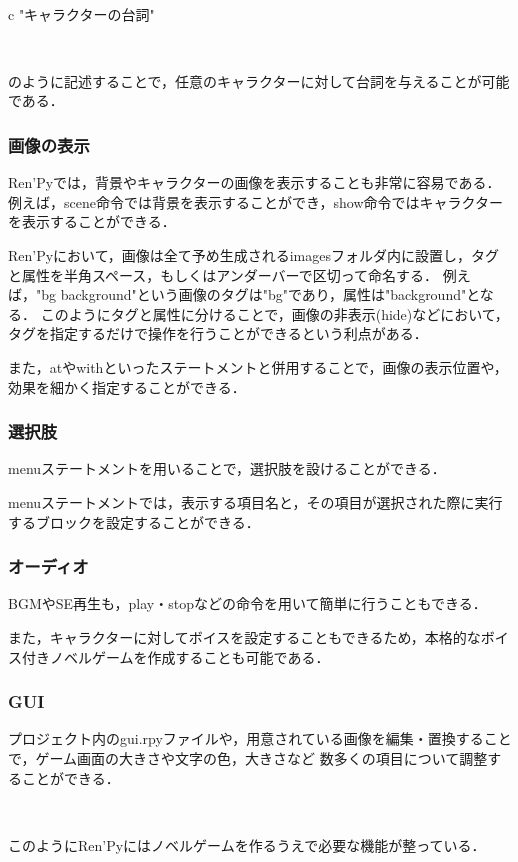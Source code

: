     ~

    c "キャラクターの台詞"

    ~

    のように記述することで，任意のキャラクターに対して台詞を与えることが可能である．

  \subsubsection{画像の表示}

    Ren'Pyでは，背景やキャラクターの画像を表示することも非常に容易である．
    例えば，scene命令では背景を表示することができ，show命令ではキャラクターを表示することができる．

    Ren'Pyにおいて，画像は全て予め生成されるimagesフォルダ内に設置し，タグと属性を半角スペース，もしくはアンダーバーで区切って命名する．
    例えば，"bg background"という画像のタグは"bg"であり，属性は"background"となる．
    このようにタグと属性に分けることで，画像の非表示(hide)などにおいて，タグを指定するだけで操作を行うことができるという利点がある．

    また，atやwithといったステートメントと併用することで，画像の表示位置や，効果を細かく指定することができる．

  \subsubsection{選択肢}

    menuステートメントを用いることで，選択肢を設けることができる．
    
    menuステートメントでは，表示する項目名と，その項目が選択された際に実行するブロックを設定することができる．

  \subsubsection{オーディオ}

    BGMやSE再生も，play・stopなどの命令を用いて簡単に行うこともできる．

    また，キャラクターに対してボイスを設定することもできるため，本格的なボイス付きノベルゲームを作成することも可能である．

  \subsubsection{GUI}

    プロジェクト内のgui.rpyファイルや，用意されている画像を編集・置換することで，ゲーム画面の大きさや文字の色，大きさなど
    数多くの項目について調整することができる．

  ~

  このようにRen'Pyにはノベルゲームを作るうえで必要な機能が整っている．

